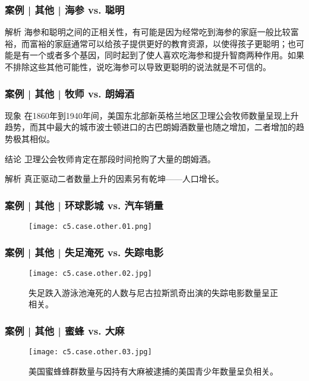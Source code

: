 \begin{frame}
  \frametitle{案例 | 其他 | 海参 vs. 聪明}
  \begin{block}{解析}
海参和聪明之间的正相关性，有可能是因为经常吃到海参的家庭一般比较富裕，而富裕的家庭通常可以给孩子提供更好的教育资源，以使得孩子更聪明；也可能是有一个或者多个基因，同时起到了使人喜欢吃海参和提升智商两种作用。如果不排除这些其他可能性，说吃海参可以导致更聪明的说法就是不可信的。
  \end{block}
\end{frame}

\begin{frame}
  \frametitle{案例 | 其他 | 牧师 vs. 朗姆酒}
  \begin{block}{现象}
 在1860年到1940年间，美国东北部新英格兰地区卫理公会牧师数量呈现上升趋势，而其中最大的城市波士顿进口的古巴朗姆酒数量也随之增加，二者增加的趋势极其相似。
    \end{block}
  \pause
  \begin{block}{结论}
卫理公会牧师肯定在那段时间抢购了大量的朗姆酒。
  \end{block}
  \pause
  \begin{block}{解析}
真正驱动二者数量上升的因素另有乾坤——人口增长。
  \end{block}
\end{frame}

\begin{frame}
  \frametitle{案例 | 其他 | 环球影城 vs. 汽车销量}
  \begin{figure}
    \centering
    \texttt{[image: c5.case.other.01.png]}
  \end{figure}
\end{frame}

\begin{frame}
  \frametitle{案例 | 其他 | 失足淹死 vs. 失踪电影}
  \begin{figure}
    \centering
    \texttt{[image: c5.case.other.02.jpg]}
    \caption{失足跌入游泳池淹死的人数与尼古拉斯凯奇出演的失踪电影数量呈正相关。}
  \end{figure}
\end{frame}

\begin{frame}
  \frametitle{案例 | 其他 | 蜜蜂 vs. 大麻}
  \begin{figure}
    \centering
    \texttt{[image: c5.case.other.03.jpg]}
    \caption{美国蜜蜂蜂群数量与因持有大麻被逮捕的美国青少年数量呈负相关。}
  \end{figure}
\end{frame}


